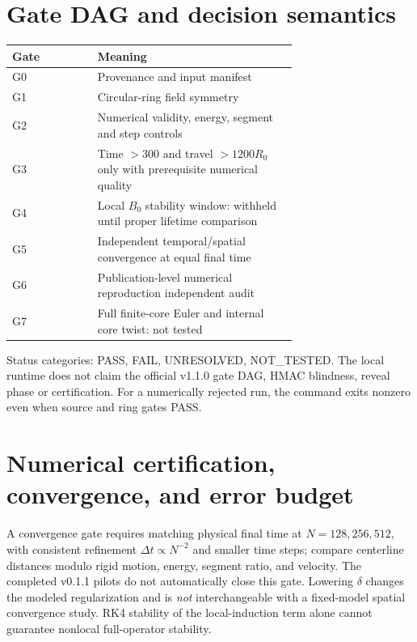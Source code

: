 \documentclass[11pt,a4paper]{article}
\begin{document}

\section{Gate DAG and decision semantics}
\begin{center}\begin{tabular}{lp{0.70\linewidth}}\toprule Gate & Meaning\\\midrule
G0 & Provenance and input manifest\\
G1 & Circular-ring field symmetry\\
G2 & Numerical validity, energy, segment and step controls\\
G3 & Time $>300$ and travel $>1200R_0$ only with prerequisite numerical quality\\
G4 & Local $B_0$ stability window: withheld until proper lifetime comparison\\
G5 & Independent temporal/spatial convergence at equal final time\\
G6 & Publication-level numerical reproduction independent audit\\
G7 & Full finite-core Euler and internal core twist: not tested\\\bottomrule\end{tabular}\end{center}
\noindent Status categories: PASS, FAIL, UNRESOLVED, NOT\_TESTED. The local runtime does not claim the official v1.1.0 gate DAG, HMAC blindness, reveal phase or certification. For a numerically rejected run, the command exits nonzero even when source and ring gates PASS.


\section{Numerical certification, convergence, and error budget}
\noindent A convergence gate requires matching physical final time at $N=128,256,512$, with consistent refinement $\Delta t\propto N^{-2}$ and smaller time steps; compare centerline distances modulo rigid motion, energy, segment ratio, and velocity. The completed v0.1.1 pilots do not automatically close this gate. Lowering $\delta$ changes the modeled regularization and is \emph{not} interchangeable with a fixed-model spatial convergence study. RK4 stability of the local-induction term alone cannot guarantee nonlocal full-operator stability.
\end{document}

